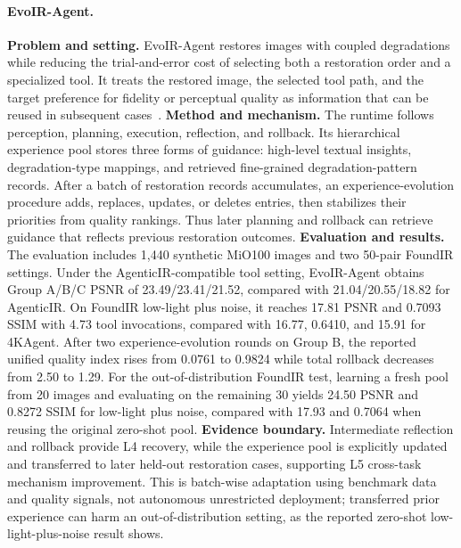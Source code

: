 \paragraph{EvoIR-Agent.}
\textbf{Problem and setting.} EvoIR-Agent restores images with coupled degradations while reducing the trial-and-error cost of selecting both a restoration order and a specialized tool. It treats the restored image, the selected tool path, and the target preference for fidelity or perceptual quality as information that can be reused in subsequent cases~\cite{avg260522208}. \textbf{Method and mechanism.} The runtime follows perception, planning, execution, reflection, and rollback. Its hierarchical experience pool stores three forms of guidance: high-level textual insights, degradation-type mappings, and retrieved fine-grained degradation-pattern records. After a batch of restoration records accumulates, an experience-evolution procedure adds, replaces, updates, or deletes entries, then stabilizes their priorities from quality rankings. Thus later planning and rollback can retrieve guidance that reflects previous restoration outcomes. \textbf{Evaluation and results.} The evaluation includes 1,440 synthetic MiO100 images and two 50-pair FoundIR settings. Under the AgenticIR-compatible tool setting, EvoIR-Agent obtains Group A/B/C PSNR of 23.49/23.41/21.52, compared with 21.04/20.55/18.82 for AgenticIR. On FoundIR low-light plus noise, it reaches 17.81 PSNR and 0.7093 SSIM with 4.73 tool invocations, compared with 16.77, 0.6410, and 15.91 for 4KAgent. After two experience-evolution rounds on Group B, the reported unified quality index rises from 0.0761 to 0.9824 while total rollback decreases from 2.50 to 1.29. For the out-of-distribution FoundIR test, learning a fresh pool from 20 images and evaluating on the remaining 30 yields 24.50 PSNR and 0.8272 SSIM for low-light plus noise, compared with 17.93 and 0.7064 when reusing the original zero-shot pool. \textbf{Evidence boundary.} Intermediate reflection and rollback provide L4 recovery, while the experience pool is explicitly updated and transferred to later held-out restoration cases, supporting L5 cross-task mechanism improvement. This is batch-wise adaptation using benchmark data and quality signals, not autonomous unrestricted deployment; transferred prior experience can harm an out-of-distribution setting, as the reported zero-shot low-light-plus-noise result shows.

